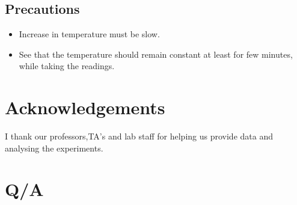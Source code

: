 \documentclass{article}
\begin{document}
\subsection{Precautions}

\begin{itemize}
\item Increase in temperature must be slow.
\item See that the temperature should remain constant at least for few minutes, while taking the
readings.
\end{itemize}


\section{Acknowledgements}

I thank our professors,TA's and lab staff for helping us provide data and analysing the experiments.

\section{Q/A}
\end{document}
